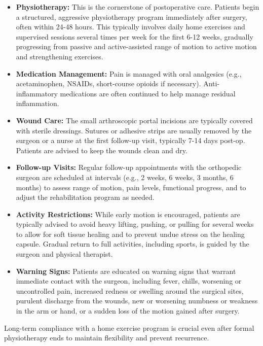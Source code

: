 \begin{itemize}
  \item \textbf{Physiotherapy:} This is the cornerstone of postoperative care. Patients begin a structured, aggressive physiotherapy program immediately after surgery, often within 24-48 hours. This typically involves daily home exercises and supervised sessions several times per week for the first 6-12 weeks, gradually progressing from passive and active-assisted range of motion to active motion and strengthening exercises.
  
  \item \textbf{Medication Management:} Pain is managed with oral analgesics (e.g., acetaminophen, NSAIDs, short-course opioids if necessary). Anti-inflammatory medications are often continued to help manage residual inflammation.
  
  \item \textbf{Wound Care:} The small arthroscopic portal incisions are typically covered with sterile dressings. Sutures or adhesive strips are usually removed by the surgeon or a nurse at the first follow-up visit, typically 7-14 days post-op. Patients are advised to keep the wounds clean and dry.
  
  \item \textbf{Follow-up Visits:} Regular follow-up appointments with the orthopedic surgeon are scheduled at intervals (e.g., 2 weeks, 6 weeks, 3 months, 6 months) to assess range of motion, pain levels, functional progress, and to adjust the rehabilitation program as needed.
  
  \item \textbf{Activity Restrictions:} While early motion is encouraged, patients are typically advised to avoid heavy lifting, pushing, or pulling for several weeks to allow for soft tissue healing and to prevent undue stress on the healing capsule. Gradual return to full activities, including sports, is guided by the surgeon and physical therapist.
  
  \item \textbf{Warning Signs:} Patients are educated on warning signs that warrant immediate contact with the surgeon, including fever, chills, worsening or uncontrolled pain, increased redness or swelling around the surgical sites, purulent discharge from the wounds, new or worsening numbness or weakness in the arm or hand, or a sudden loss of the motion gained after surgery.
\end{itemize}

Long-term compliance with a home exercise program is crucial even after formal physiotherapy ends to maintain flexibility and prevent recurrence.

